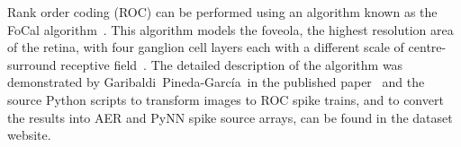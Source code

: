 %
Rank order coding (ROC) can be performed using an algorithm known as the
{FoCal algorithm~\citep{sen2009evaluating}}.
This algorithm models the foveola, the highest resolution area of the retina, with four ganglion cell layers each with a different scale of centre-surround receptive field~\citep{kolb2003retina}.
The detailed description of the algorithm was demonstrated by Garibaldi~Pineda-Garc\'ia\, in the published paper~\citep{liu2016bench} and the source Python scripts to transform images to ROC spike trains, and to convert the results into AER and PyNN spike source arrays, can be found in the dataset website.
%
%
%
